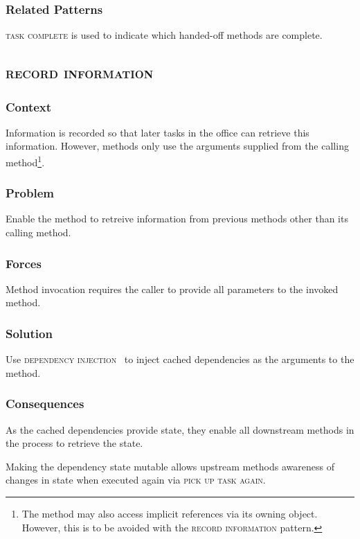 \documentclass[prodmode]{style/acmlarge}
\begin{document}
\subsubsection*{Related Patterns} \textsc{task complete} is used to indicate
which handed-off methods are complete.



\subsection{\textsc{\textbf{record information}}}

\subsubsection*{Context} Information is recorded so that later tasks in the
office can retrieve this information.  However, methods only use the arguments
supplied from the calling method\footnote{The method may also access implicit
references via its owning object.  However, this is to be avoided with the
\textsc{record information} pattern.}.

\subsubsection*{Problem} Enable the method to retreive information from previous
methods other than its calling method.

\subsubsection*{Forces} Method invocation requires the caller to provide all
parameters to the invoked method.

\subsubsection*{Solution} Use \textsc{dependency injection}~\cite{ioc} to inject
cached dependencies as the arguments to the method.

\subsubsection*{Consequences} As the cached dependencies provide state, they
enable all downstream methods in the process to retrieve the state.

Making the dependency state mutable allows upstream methods awareness of changes
in state when executed again via \textsc{pick up task again}.
\end{document}
